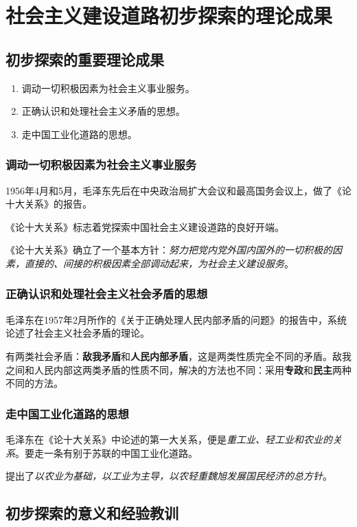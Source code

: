 \chapter{社会主义建设道路初步探索的理论成果}

\section{初步探索的重要理论成果}
\begin{enumerate}
    \item 调动一切积极因素为社会主义事业服务。
    \item 正确认识和处理社会主义矛盾的思想。
    \item 走中国工业化道路的思想。
\end{enumerate}

    \subsection{调动一切积极因素为社会主义事业服务}
    1956年4月和5月，毛泽东先后在中央政治局扩大会议和最高国务会议上，做了《论十大关系》的报告。

    《论十大关系》标志着党探索中国社会主义建设道路的良好开端。

    《论十大关系》确立了一个基本方针：\emph{努力把党内党外国内国外的一切积极的因素，直接的、间接的积极因素全部调动起来，为社会主义建设服务}。

    \subsection{正确认识和处理社会主义社会矛盾的思想}
    毛泽东在1957年2月所作的《关于正确处理人民内部矛盾的问题》的报告中，系统论述了社会主义社会矛盾的理论。
    
    有两类社会矛盾：\textbf{敌我矛盾}和\textbf{人民内部矛盾}，这是两类性质完全不同的矛盾。敌我之间和人民内部这两类矛盾的性质不同，解决的方法也不同：采用\textbf{专政}和\textbf{民主}两种不同的方法。

    \subsection{走中国工业化道路的思想}
    毛泽东在《论十大关系》中论述的第一大关系，便是\emph{重工业、轻工业和农业的关系}。要走一条有别于苏联的中国工业化道路。

    提出了\emph{以农业为基础，以工业为主导，以农轻重魏旭发展国民经济的总方针}。


\section{初步探索的意义和经验教训}

